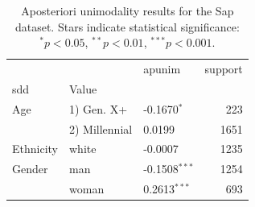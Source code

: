 \begin{table}[t]
\centering
\caption{Aposteriori unimodality results for the Sap dataset. Stars indicate statistical significance: $^{*}p<0.05$, $^{**}p<0.01$, $^{***}p<0.001$.}
\label{tab:sap-results}
\begin{tabular}{lllr}
\toprule
 &  & apunim & support \\
\ac{sdd} & Value &  &  \\
\midrule
Age & 1) Gen. X+ & -0.1670$^{*}$ & 223 \\
 & 2) Millennial & 0.0199 & 1651 \\
Ethnicity & white & -0.0007 & 1235 \\
Gender & man & -0.1508$^{***}$ & 1254 \\
 & woman & 0.2613$^{***}$ & 693 \\
\bottomrule
\end{tabular}
\end{table}
